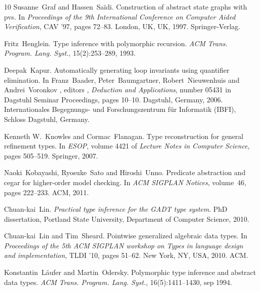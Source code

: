 \documentclass{article}
\newcommand{\tmtextit}[1]{{\itshape{#1}}}
\begin{document}
\begin{thebibliography}{10}
  Susanne~Graf  and 
  Hassen~Sa{\"i}di.{\newblock} Construction of abstract state graphs with
  pvs.{\newblock} In \tmtextit{Proceedings of the 9th International Conference
  on Computer Aided Verification}, CAV '97,  pages  72--83. London, UK, UK,
  1997. Springer-Verlag.{\newblock}
  
  Fritz~Henglein.{\newblock} Type inference with
  polymorphic recursion.{\newblock} \tmtextit{ACM Trans. Program. Lang.
  Syst.}, 15(2):253--289, 1993.{\newblock}
  
  Deepak~Kapur.{\newblock} Automatically generating
  loop invariants using quantifier elimination.{\newblock} In  Franz~Baader,
  Peter~Baumgartner, Robert~Nieuwenhuis  and  Andrei~Voronkov , editors ,
  \tmtextit{Deduction and Applications},  number  05431  in  Dagstuhl Seminar
  Proceedings,  pages  10--10. Dagstuhl, Germany, 2006. Internationales
  Begegnungs- und Forschungszentrum f{\"u}r Informatik (IBFI), Schloss
  Dagstuhl, Germany.{\newblock}
  
  Kenneth W.~Knowles  and  Cormac~Flanagan.{\newblock}
  Type reconstruction for general refinement types.{\newblock} In
  \tmtextit{ESOP},  volume  4421  of \tmtextit{Lecture Notes in Computer
  Science},  pages  505--519. Springer, 2007.{\newblock}
  
  Naoki~Kobayashi, Ryosuke~Sato  and 
  Hiroshi~Unno.{\newblock} Predicate abstraction and cegar for higher-order
  model checking.{\newblock} In \tmtextit{ACM SIGPLAN Notices},  volume~46, 
  pages  222--233. ACM, 2011.{\newblock}
  
  Chuan-kai~Lin.{\newblock}
  \tmtextit{Practical type inference for the GADT type system}.{\newblock} PhD
  dissertation, Portland State University, Department of Computer Science,
  2010.{\newblock}
  
  Chuan-kai~Lin  and  Tim~Sheard.{\newblock}
  Pointwise generalized algebraic data types.{\newblock} In
  \tmtextit{Proceedings of the 5th ACM SIGPLAN workshop on Types in language
  design and implementation}, TLDI '10,  pages  51--62. New York, NY, USA,
  2010. ACM.{\newblock}
  
  Konstantin~L{\"a}ufer  and  Martin~Odersky.{\newblock}
  Polymorphic type inference and abstract data types.{\newblock} \tmtextit{ACM
  Trans. Program. Lang. Syst.}, 16(5):1411--1430, sep 1994.{\newblock}
  

\end{thebibliography}
\end{document}
